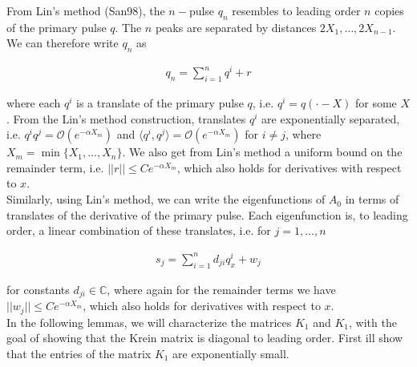\documentclass[12pt]{article}
\def\C{{\mathbb C}}
\begin{document}
From Lin's method (San98), the $n-$pulse $q_n$ resembles to leading order $n$ copies of the primary pulse $q$. The $n$ peaks are separated by distances $2 X_1, \dots, 2 X_{n-1}$. We can therefore write $q_n$ as 

\begin{align*}\label{qn}
q_n = \sum_{i = 1}^{n} q^i + r
\end{align*}

where each $q^i$ is a translate of the primary pulse $q$, i.e. $q^i = q(\cdot - X)$ for some $X$. From the Lin's method construction, translates $q^i$ are exponentially separated, i.e. $q^i q^j = \mathcal{O}(e^{-\alpha X_m})$ and $\langle q^i, q^j \rangle = \mathcal{O}(e^{-\alpha X_m})$ for $i \neq j$, where $X_m = \min\{ X_1, \dots, X_n \}$. We also get from Lin's method a uniform bound on the remainder term, i.e. $||r|| \leq C e^{-\alpha X_m}$, which also holds for derivatives with respect to $x$.\\

Similarly, using Lin's method, we can write the eigenfunctions of $A_0$ in terms of translates of the derivative of the primary pulse. Each eigenfunction is, to leading order, a linear combination of these translates, i.e. for $j = 1, \dots, n$

\begin{align}\label{sj}
s_j = \sum_{i = 1}^{n} d_{ji} q^i_x + w_j
\end{align}

for constants $d_{ji} \in \C$, where again for the remainder terms we have $||w_j|| \leq C e^{-\alpha X_m}$, which also holds for derivatives with respect to $x$. \\

In the following lemmas, we will characterize the matrices $K_1$ and $K_1$, with the goal of showing that the Krein matrix is diagonal to leading order. First ill show that the entries of the matrix $K_1$ are exponentially small.\\

\end{document}
